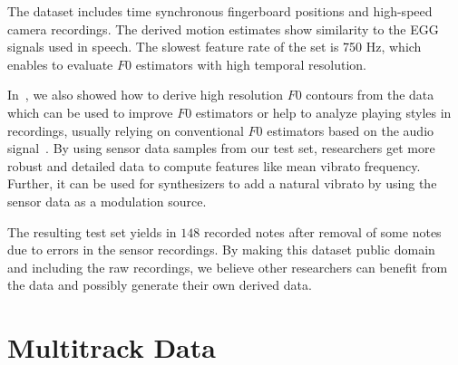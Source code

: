 \par
The dataset includes time synchronous fingerboard positions and high-speed camera recordings. 
The derived motion estimates show similarity to the EGG signals used in speech. 
The slowest feature rate of the set is 750 Hz, which enables to evaluate $F0$ estimators with high temporal resolution. 
\par
In~\cite{stoeter15acm}, we also showed how to derive high resolution $F0$ contours from the data which can be used to improve $F0$ estimators or help to analyze playing styles in recordings, usually relying on conventional $F0$ estimators based on the audio signal~\cite{mellody2000time}. 
By using sensor data samples from our test set, researchers get more robust and detailed data to compute features like mean vibrato frequency. 
Further, it can be used for synthesizers to add a natural vibrato by using the sensor data as a modulation source.
\par
The resulting test set yields in $148$ recorded notes after removal of some notes due to errors in the sensor recordings.
By making this dataset public domain~\cite{oss_muserc} and including the raw recordings, we believe other researchers can benefit from the data and possibly generate their own derived data.

\section{Multitrack Data}%
\label{sec:multitrack}


